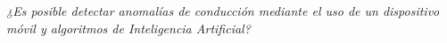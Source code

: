 \begin{center}
\textit{\LARGE{¿Es posible detectar anomal\'{i}as de conducci\'{o}n mediante el uso de un dispositivo móvil y algoritmos de Inteligencia Artificial?}}
\end{center}

